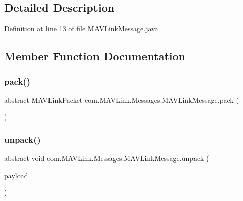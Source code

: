 \subsection{Detailed Description}


Definition at line 13 of file M\+A\+V\+Link\+Message.\+java.



\subsection{Member Function Documentation}
\mbox{\label{classcom_1_1MAVLink_1_1Messages_1_1MAVLinkMessage_af25705beb4ae8d8ad2f274202ed4fe6e}} 
\subsubsection{\texorpdfstring{pack()}{pack()}}
{\footnotesize\ttfamily abstract M\+A\+V\+Link\+Packet com.\+M\+A\+V\+Link.\+Messages.\+M\+A\+V\+Link\+Message.\+pack (\begin{DoxyParamCaption}{ }\end{DoxyParamCaption})\hspace{0.3cm}{\ttfamily [abstract]}}

\mbox{\label{classcom_1_1MAVLink_1_1Messages_1_1MAVLinkMessage_a323793ff4d45acc7c8e5430d92265156}} 
\subsubsection{\texorpdfstring{unpack()}{unpack()}}
{\footnotesize\ttfamily abstract void com.\+M\+A\+V\+Link.\+Messages.\+M\+A\+V\+Link\+Message.\+unpack (\begin{DoxyParamCaption}\item[{\mbox{\hyperlink{classcom_1_1MAVLink_1_1Messages_1_1MAVLinkPayload}{M\+A\+V\+Link\+Payload}}}]{payload }\end{DoxyParamCaption})\hspace{0.3cm}{\ttfamily [abstract]}}



